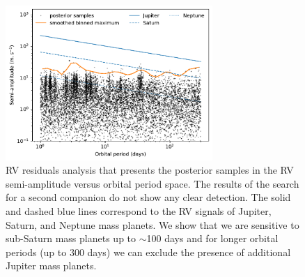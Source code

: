 \documentclass{aa}
\begin{document}
\begin{appendix}
\begin{figure}
  \centering
  \includegraphics[width=0.7\textwidth]{figures/detection_limit_TIC466206508_semi-ampl_clean.pdf}
 \caption{RV residuals analysis that presents the posterior samples in the RV semi-amplitude versus orbital period space. The results of the search for a second companion do not show any clear detection. The solid and dashed blue lines correspond to the RV signals of Jupiter, Saturn, and Neptune mass planets. We show that we are sensitive to sub-Saturn mass planets up to $\sim$100 days and for longer orbital periods (up to 300 days) we can exclude the presence of additional Jupiter mass planets.}
  \label{fig:rv_resid}
\end{figure}


\end{appendix}
\end{document}
